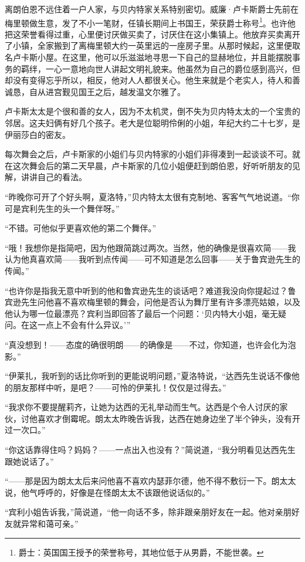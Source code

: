 \par 离朗伯恩不远住着一户人家，与贝内特家关系特别密切。威廉·卢卡斯爵士先前在梅里顿做生意，发了不小一笔财，任镇长期间上书国王，荣获爵士称号\footnote{爵士：英国国王授予的荣誉称号，其地位低于从男爵，不能世袭。}。也许他把这荣誉看得过重，心里便讨厌做买卖了，讨厌住在这小集镇上。他放弃买卖离开了小镇，全家搬到了离梅里顿大约一英里远的一座房子里。从那时候起，这里便取名卢卡斯小屋。在这里，他可以乐滋滋地寻思一下自己的显赫地位，并且能摆脱事务的羁绊，一心一意地向世人讲起文明礼貌来。他虽然为自己的爵位感到高兴，但却没有变得忘乎所以，相反，他对人人都很关心。他生来就是个老实人，待人和善诚恳，自从进宫觐见国王之后，越发温文尔雅了。
\par 卢卡斯太太是个很和善的女人，因为不太机灵，倒不失为贝内特太太的一个宝贵的邻居。这夫妇俩有好几个孩子。老大是位聪明伶俐的小姐，年纪大约二十七岁，是伊丽莎白的密友。
\par 每次舞会之后，卢卡斯家的小姐们与贝内特家的小姐们非得凑到一起谈谈不可。就在这次舞会后的第二天早晨，卢卡斯家的几位小姐便赶到朗伯恩，好听听朋友的见解，讲讲自己的看法。
\par “昨晚你可开了个好头啊，夏洛特，”贝内特太太很有克制地、客客气气地说道。“你可是宾利先生的头一个舞伴呀。”
\par “不错。可他似乎更喜欢他的第二个舞伴。”
\par “哦！我想你是指简吧，因为他跟简跳过两次。当然，他的确像是很喜欢简——我认为他真喜欢简——我听到点传闻——可不知道是怎么回事——关于鲁宾逊先生的传闻。”
\par “也许你是指我无意中听到的他和鲁宾逊先生的谈话吧？难道我没向你提起过？鲁宾逊先生问他喜不喜欢梅里顿的舞会，问他是否认为舞厅里有许多漂亮姑娘，以及他认为哪一位最漂亮？宾利当即回答了最后一个问题：‘贝内特大小姐，毫无疑问。在这一点上不会有什么异议。’”
\par “真没想到！——态度的确很明朗——的确像是——不过，你知道，也许会化为泡影。”
\par “伊莱扎，我听到的话比你听到的更能说明问题，”夏洛特说，“达西先生说话不像他的朋友那样中听，是吧？——可怜的伊莱扎！仅仅是过得去。”
\par “我求你不要提醒莉齐，让她为达西的无礼举动而生气。达西是个令人讨厌的家伙，讨他喜欢才倒霉呢。朗太太昨晚告诉我，达西在她身边坐了半个钟头，没有开过一次口。”
\par “你这话靠得住吗？妈妈？——一点出入也没有？”简说道，“我分明看见达西先生跟她说话了。”
\par “——那是因为朗太太后来问他喜不喜欢内瑟菲尔德，他不得不敷衍一下。朗太太说，他气呼呼的，好像是在怪朗太太不该跟他说话似的。”
\par “宾利小姐告诉我，”简说道，“他一向话不多，除非跟亲朋好友在一起。他对亲朋好友就异常和蔼可亲。”
